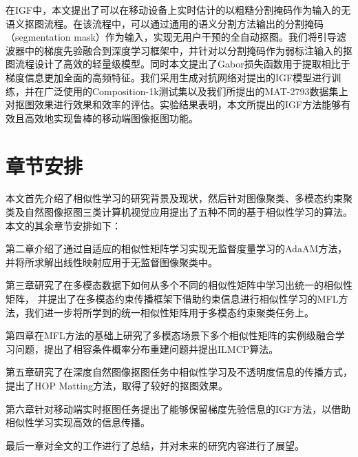 \begin{itemize}
    \indent 在IGF中，本文提出了可以在移动设备上实时估计的以粗糙分割掩码作为输入的无语义抠图流程。在该流程中，可以通过通用的语义分割方法输出的分割掩码（segmentation mask）作为输入，实现无用户干预的全自动抠图。我们将引导滤波器\cite{he2010guided}中的梯度先验融合到深度学习框架中，并针对以分割掩码作为弱标注输入的抠图流程设计了高效的轻量级模型。同时本文提出了Gabor损失函数用于提取相比于梯度信息更加全面的高频特征。我们采用生成对抗网络对提出的IGF模型进行训练，并在广泛使用的Composition-1k测试集以及我们所提出的MAT-2793数据集上对抠图效果进行效果和效率的评估。实验结果表明，本文所提出的IGF方法能够有效且高效地实现鲁棒的移动端图像抠图功能。
    

\end{itemize}

\section{章节安排}
本文首先介绍了相似性学习的研究背景及现状，然后针对图像聚类、多模态约束聚类及自然图像抠图三类计算机视觉应用提出了五种不同的基于相似性学习的算法。
本文的其余章节安排如下：

第二章介绍了通过自适应的相似性矩阵学习实现无监督度量学习的AdaAM方法，并将所求解出线性映射应用于无监督图像聚类中。

第三章研究了在多模态数据下如何从多个不同的相似性矩阵中学习出统一的相似性矩阵，
并提出了在多模态约束传播框架下借助约束信息进行相似性学习的MFL方法，我们进一步将所学到的统一相似性矩阵用于多模态约束聚类任务上。

第四章在MFL方法的基础上研究了多模态场景下多个相似性矩阵的实例级融合学习问题，提出了相容条件概率分布重建问题并提出ILMCP算法。

第五章研究了在深度自然图像抠图任务中相似性学习及不透明度信息的传播方式，提出了HOP Matting方法，取得了较好的抠图效果。

第六章针对移动端实时抠图任务提出了能够保留梯度先验信息的IGF方法，以借助相似性学习实现高效的信息传播。

最后一章对全文的工作进行了总结，并对未来的研究内容进行了展望。